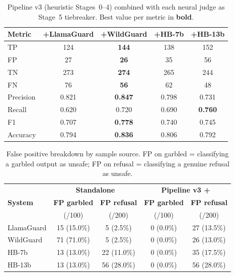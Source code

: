 \begin{table}[ht]
\centering
\caption{Pipeline v3 (heuristic Stages~0--4) combined with each neural judge as Stage~5 tiebreaker. Best value per metric in \textbf{bold}.}
\label{tab:judge_pipeline}
\setlength{\tabcolsep}{6pt}
\renewcommand{\arraystretch}{1.15}
\begin{tabular}{@{}lcccc@{}}
\toprule
\textbf{Metric} & \textbf{+LlamaGuard} & \textbf{+WildGuard} & \textbf{+HB-7b} & \textbf{+HB-13b} \\
\midrule
TP  & 124 & \textbf{144} & 138 & 152 \\
FP  & 27  & \textbf{26}  & 35  & 56  \\
TN  & 273 & \textbf{274} & 265 & 244 \\
FN  & 76  & \textbf{56}  & 62  & 48  \\
\midrule
Precision & 0.821 & \textbf{0.847} & 0.798 & 0.731 \\
Recall    & 0.620 & 0.720 & 0.690 & \textbf{0.760} \\
F1        & 0.707 & \textbf{0.778} & 0.740 & 0.745 \\
Accuracy  & 0.794 & \textbf{0.836} & 0.806 & 0.792 \\
\bottomrule
\end{tabular}
\setlength{\tabcolsep}{6pt}
\renewcommand{\arraystretch}{1.0}
\end{table}

\begin{table}[ht]
\centering
\caption{False positive breakdown by sample source. FP on garbled = classifying a garbled output as unsafe; FP on refusal = classifying a genuine refusal as unsafe.}
\label{tab:judge_fp}
\setlength{\tabcolsep}{4pt}
\renewcommand{\arraystretch}{1.15}
\begin{tabular}{@{}lcc|cc@{}}
\toprule
& \multicolumn{2}{c|}{\textbf{Standalone}} & \multicolumn{2}{c}{\textbf{Pipeline v3 +}} \\
\textbf{System} & \textbf{FP garbled} & \textbf{FP refusal} & \textbf{FP garbled} & \textbf{FP refusal} \\
& (/100) & (/200) & (/100) & (/200) \\
\midrule
LlamaGuard  & 15 (15.0\%) & 5 (2.5\%)   & 0 (0.0\%) & 27 (13.5\%) \\
WildGuard   & 71 (71.0\%) & 5 (2.5\%)   & 0 (0.0\%) & 26 (13.0\%) \\
HB-7b       & 13 (13.0\%) & 22 (11.0\%) & 0 (0.0\%) & 35 (17.5\%) \\
HB-13b      & 13 (13.0\%) & 56 (28.0\%) & 0 (0.0\%) & 56 (28.0\%) \\
\bottomrule
\end{tabular}
\setlength{\tabcolsep}{6pt}
\renewcommand{\arraystretch}{1.0}
\end{table}

